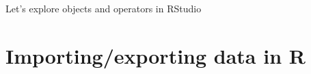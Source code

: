 \documentclass[8pt]{beamer}
\begin{document}

\begin{frame}
\frametitle{\insertsection}

Let's explore objects and operators in RStudio

\end{frame}






\section{Importing/exporting data in R}


\bgroup
{}
\begin{frame}[plain]{}
\begin{center}
\color{white}{\Huge\insertsection}
\end{center}
\end{frame}
\egroup

\end{document}
